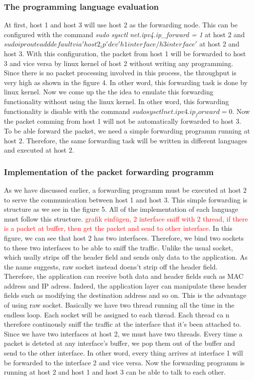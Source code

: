 \subsubsection{The programming language evaluation}
At first, host 1 and host 3 will use host 2 as the forwarding node. This can be configured with the command \textit{sudo sysctl net.ipv4.ip\_forward = 1} at host 2 and  $sudo ip route add default via 'host2_ip' dev 'h1 interface/h3 interface'$ at host 2 and host 3. With this configuration, the packet from host 1 will be forwarded to host 3 and vice versa by linux kernel of host 2 without writing any programming. Since there is no packet processing involved in this process, the throughput is very high as shown in the figure 4. In other word, this forwarding task is done by linux kernel. Now we come up the the idea to emulate this forwarding functionality without using the linux kernel. In other word, this forwarding functionality is disable with the command $sudo sysctl net.ipv4.ip_forward=0$. Now the packet comming from host 1 will not be automatically forwarded to host 3. To be able forward the packet, we need a simple forwarding programm running at host 2. Therefore, the same forwarding task will be written in different languages and executed at host 2.

\subsubsection{Implementation of the packet forwarding programm}
As we have discussed earlier, a forwarding programm must be executed at host 2 to serve the communication between host 1 and host 3. This simple forwarding is structure as we see in the figure 5. All of the implementation of each language must follow this structure. \textcolor{red}{grafik einfügen, 2 interface sniff with 2 thread, if there is a packet at buffer, then get the packet and send to other interface}. In this figure, we can see that host 2 has two interfaces. Therefore, we bind two sockets to these two interfaces to be able to sniff the traffic. Unlike the usual socket, which usally strips off the header field and sends only data to the application. As the name suggests, raw socket instead doens't strip off the header field. Therefore, the application can receive both data and header fields such as MAC address and IP adress. Indeed, the application layer can manipulate these header fields such as modifying the destination address and so on. This is the advantage of using raw socket. Basically we have two thread running all the time in the endless loop. Each socket will be assigned to each thread. Each thread ca n therefore continously sniff the traffic at the interface that it's been attached to. Since we have two interfaces at host 2, we must have two threads. Every time a packet is deteted at any interface's buffer, we pop them out of the buffer and send to the other interface. In other word, every thing arrives at interface 1 will be forwarded to the interface 2 and vice versa. Now the forwarding programm is running at host 2 and host 1 and host 3 can be able to talk to each other.

